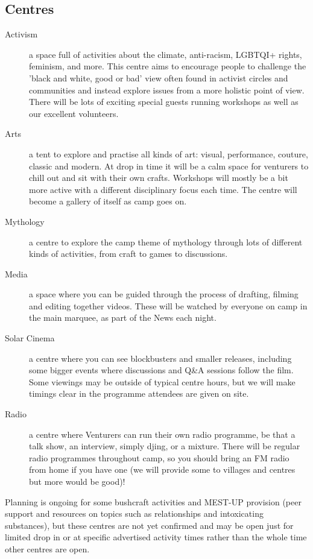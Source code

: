 \documentclass[a4paper, 11pt]{report}
\begin{document}
\subsection{Centres}
\begin{description}
    \item[Activism] a space full of activities about the climate, anti-racism, LGBTQI+ rights, feminism, and more. This centre aims to encourage people to challenge the 'black and white, good or bad' view often found in activist circles and communities and instead explore issues from a more holistic point of view. There will be lots of exciting special guests running workshops as well as our excellent volunteers.
    \item[Arts] a tent to explore and practise all kinds of art: visual, performance, couture, classic and modern. At drop in time it will be a calm space for venturers to chill out and sit with their own crafts. Workshops will mostly be a bit more active with a different disciplinary focus each time. The centre will become a gallery of itself as camp goes on.
    \item[Mythology] a centre to explore the camp theme of mythology through lots of  different kinds of activities, from craft to games to discussions.
    \item[Media] a space where you can be guided through the process of drafting, filming and editing together videos. These will be watched by everyone on camp in the main marquee, as part of the News each night.
    \item[Solar Cinema] a centre where you can see blockbusters and smaller releases, including some bigger events where discussions and Q\&A sessions follow the film. Some viewings may be outside of typical centre hours, but we will make timings clear in the programme attendees are given on site.
    \item[Radio] a centre where Venturers can run their own radio programme, be that a talk show, an interview, simply djing, or a mixture. There will be regular radio programmes throughout camp, so you should bring an FM radio from home if you have one (we will provide some to villages and centres but more would be good)!
\end{description}

Planning is ongoing for some bushcraft activities and MEST-UP provision (peer support and resources on topics such as relationships and intoxicating substances), but these centres are not yet confirmed and may be open just for limited drop in or at specific advertised activity times rather than the whole time other centres are open.
\end{document}
